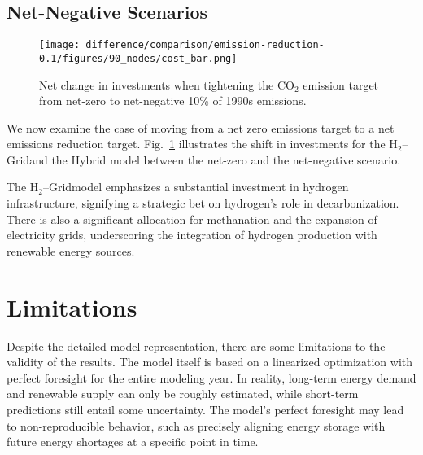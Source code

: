 \documentclass[twocolumn]{article}
\newcommand{\carbon}{CO$_2$}
\newcommand{\hydrogen}{H$_2$}
\newcommand{\hydrogengrid}{\hydrogen{}--Grid}
\begin{document}

\subsection*{Net-Negative Scenarios}

\begin{figure}[h]
    \centering
    \texttt{[image: difference/comparison/emission-reduction-0.1/figures/90\_nodes/cost\_bar.png]}
    \caption[short]{Net change in investments when tightening the \carbon{} emission target from net-zero to net-negative 10\% of 1990s emissions.}
    \label{fig:net-negative_cost_bar}
\end{figure}

We now examine the case of moving from a net zero emissions target to a net emissions reduction target. Fig.~\ref{fig:net-negative_cost_bar} illustrates the shift in investments for the \hydrogengrid and the Hybrid model between the net-zero and the net-negative scenario.




The \hydrogengrid model emphasizes a substantial investment in hydrogen infrastructure, signifying a strategic bet on hydrogen's role in decarbonization. There is also a significant allocation for methanation and the expansion of electricity grids, underscoring the integration of hydrogen production with renewable energy sources.





\section{Limitations}
\label{sec:limitations}

Despite the detailed model representation, there are some limitations to the validity of the results. The model itself is based on a linearized optimization with perfect foresight for the entire modeling year. In reality, long-term energy demand and renewable supply can only be roughly estimated, while short-term predictions still entail some uncertainty. The model's perfect foresight may lead to non-reproducible behavior, such as precisely aligning energy storage with future energy shortages at a specific point in time.
\end{document}
